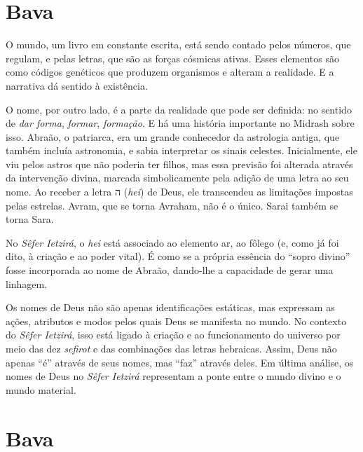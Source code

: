 {%
\chapter*{Bava \smallskip{}}

\begin{center}
{\huge{}}
\end{center}

O mundo, um livro em constante escrita, está sendo contado pelos números, que regulam, e pelas letras, que são as forças cósmicas ativas. Esses elementos são como códigos genéticos que produzem organismos e alteram a realidade. E a narrativa dá sentido à existência. 

O nome, por outro lado, é a parte da realidade que pode ser definida: no sentido de \textit{dar forma}, \textit{formar}, \textit{formação}. E há uma história importante no Midrash sobre isso. Abraão, o patriarca, era um grande conhecedor da astrologia antiga, que também incluía astronomia, e sabia interpretar os sinais celestes. Inicialmente, ele viu pelos astros que não poderia ter filhos, mas essa previsão foi alterada através da intervenção divina, marcada simbolicamente pela adição de uma letra ao seu nome. Ao receber a letra {\frank ה} (\textit{hei}) de Deus, ele transcendeu as limitações impostas pelas estrelas. Avram, que se torna Avraham, não é o único. Sarai também se torna Sara.

No \textit{Sêfer Ietzirá}, o \textit{hei} está associado ao elemento ar, ao fôlego (e, como já foi dito, à criação e ao poder vital). É como se a própria essência do ``sopro divino'' fosse incorporada ao nome de Abraão, dando-lhe a capacidade de gerar uma linhagem.


Os nomes de Deus não são apenas identificações estáticas, mas expressam as ações, atributos e modos pelos quais Deus se manifesta no mundo. No contexto do \textit{Sêfer Ietzirá}, isso está ligado à criação e ao funcionamento do universo por meio das dez \textit{sefirot} e das combinações das letras hebraicas. Assim, Deus não apenas ``é'' através de seus nomes, mas ``faz'' através deles. Em última análise, os nomes de Deus no \textit{Sêfer Ietzirá} representam a ponte entre o mundo divino e o mundo material.

\chapter*{Bava \smallskip{}}

}
